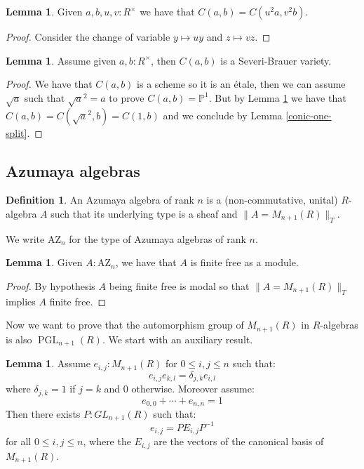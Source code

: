 \documentclass[10pt,a4paper]{article}
\theoremstyle{definition}
\newtheorem{lemma}[theorem]{Lemma}
\newtheorem{definition}[theorem]{Definition}
\DeclareMathOperator{\PGL}{PGL}
\newcommand{\AZ}{\mathrm{AZ}}
\newcommand{\propTrunc}[1]{\lVert #1 \rVert}
\newcommand{\bP}{\mathbb{P}}
\begin{document}
\begin{lemma}\label{conic-change-variable}
Given $a,b,u,v:R^\times$ we have that $C(a,b) = C(u^2a,v^2b)$.
\end{lemma}

\begin{proof}
Consider the change of variable $y\mapsto uy$ and $z\mapsto vz$.
\end{proof}

\begin{lemma}
Assume given $a,b:R^\times$, then $C(a,b)$ is a Severi-Brauer variety.
\end{lemma}

\begin{proof}
We have that $C(a,b)$ is a scheme so it is an étale, then we can assume $\sqrt{a}$ such that $\sqrt{a}^2 = a$ to prove $C(a,b)=\bP^1$. But by Lemma \ref{conic-change-variable} we have that $C(a,b) = C(\sqrt{a}^2,b) = C(1,b)$ and we conclude by Lemma \ref{conic-one-split}.
\end{proof}


\subsection{Azumaya algebras}

\begin{definition}
An Azumaya algebra of rank $n$ is a (non-commutative, unital) $R$-algebra $A$ such that its underlying type is a sheaf and $\propTrunc{A=M_{n+1}(R)}_T$.
\end{definition}

We write $\AZ_n$ for the type of Azumaya algebras of rank $n$.

\begin{lemma}\label{azumayas-are-finite-free}
Given $A:\AZ_n$, we have that $A$ is finite free as a module.
\end{lemma}

\begin{proof}
By hypothesis $A$ being finite free is modal so that $\propTrunc{A=M_{n+1}(R)}_T$ implies $A$ finite free.
\end{proof}

Now we want to prove that the automorphism group of $M_{n+1}(R)$ in $R$-algebras is also $\PGL_{n+1}(R)$. We start with an auxiliary result.

\begin{lemma}\label{fundamental-system-matrices}
Assume $e_{i,j}:M_{n+1}(R)$ for $0\leq i,j\leq n$ such that:
\[e_{i,j}e_{k,l} = \delta_{j,k}e_{i,l}\]
where $\delta_{j,k} = 1$ if $j=k$ and $0$ otherwise. Moreover assume:
\[e_{0,0}+\cdots+e_{n,n}=1\]
Then there exists $P:GL_{n+1}(R)$ such that:
\[e_{i,j} = PE_{i,j}P^{-1}\]
for all $0\leq i,j\leq n$, where the $E_{i,j}$ are the vectors of the canonical basis of $M_{n+1}(R)$.
\end{lemma}
\end{document}
